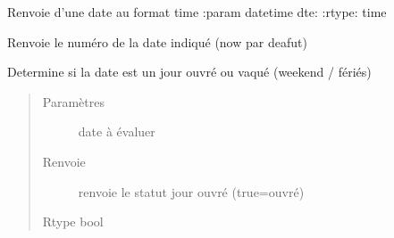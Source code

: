 \documentclass[letterpaper,10pt,french]{sphinxmanual}
\begin{document}

\begin{fulllineitems}
\label{\detokenize{modules/dtemng:toolbox.dtemng.get_time}}
Renvoie d’une date au format time
:param datetime dte:
:rtype: time

\end{fulllineitems}


\begin{fulllineitems}
\label{\detokenize{modules/dtemng:toolbox.dtemng.get_weeks_num}}
Renvoie le numéro de la date indiqué (now par deafut)

\end{fulllineitems}


\begin{fulllineitems}
\label{\detokenize{modules/dtemng:toolbox.dtemng.is_workday}}
Determine si la date est un jour ouvré ou vaqué (week\sphinxhyphen{}end / fériés)
\begin{quote}\begin{description}
\item[{Paramètres}] \leavevmode
{} \textendash{} date à évaluer

\item[{Renvoie}] \leavevmode
renvoie le statut jour ouvré (true=ouvré)

\item[{Rtype bool}] \leavevmode
\end{description}\end{quote}

\end{fulllineitems}

\end{document}
